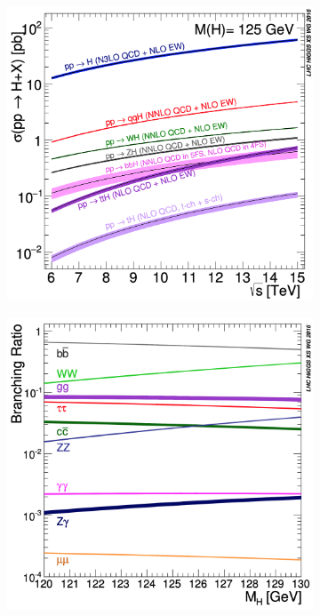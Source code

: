 \begin{figure}[ht]
        \centering
        \begin{subfigure}[b]{0.475\textwidth}
            \centering
            \includegraphics[width=\textwidth]{MSc_Thesis/fig/higgs-xsec-vs-sqrtS.png}
            \label{higgs-xsec-vs-sqrtS}
        \end{subfigure}
        \hspace{0.2cm}
        \begin{subfigure}[b]{0.475\textwidth}  
            \centering 
            \includegraphics[width=\textwidth]{MSc_Thesis/fig/higgs-br-vs-mH.png}

\end{subfigure}
\end{figure}
